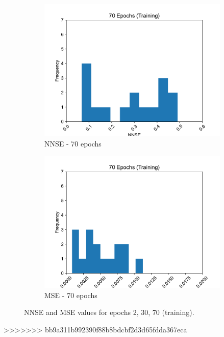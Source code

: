\documentclass[11pt,twocolumn]{article}
\begin{document}
\begin{figure}[p]
\begin{subfigure}[b]{0.49\textwidth}
        \centering\includegraphics[width=1.0\linewidth]{images/70_training-NNSE.pdf}
        \caption{NNSE - 70 epochs}
        \label{fig:tbd3}
     \end{subfigure}
     \hfill
     \begin{subfigure}[b]{0.49\textwidth}
        \centering\includegraphics[width=1.0\linewidth]{images/70_training-MSE.pdf}
        \caption{MSE - 70 epochs}
        \label{fig:tbd4}
     \end{subfigure}
        \caption{NNSE and MSE values for epochs 2, 30, 70 (training).}
        \label{fig:six graphs}
\end{figure}
>>>>>>> bb9a311b992390f88b8bdcbf2d3d65fdda367eca
\end{document}
